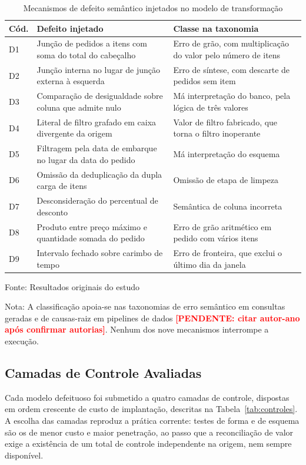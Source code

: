 \documentclass[11pt,a4paper]{article}
\newcommand{\fonteprop}[1]{%
  \par\vspace{2pt}%
  {\singlespacing\fontsize{11}{13}\selectfont\RaggedRight Fonte: #1\par}}
\newcommand{\fonteoriginal}{\fonteprop{Resultados originais do estudo}}
\newcommand{\notatab}[1]{%
  \par{\singlespacing\fontsize{11}{13}\selectfont\RaggedRight Nota: #1\par}}
\newcommand{\pend}[1]{\textcolor{red}{\textbf{[PENDENTE: #1]}}}
\begin{document}
\begin{table}[htbp]
\centering
\caption{Mecanismos de defeito semântico injetados no modelo de transformação}
\label{tab:defeitos}
\begin{singlespace}
\fontsize{10}{12}\selectfont
\begin{tabular}{@{}p{0.8cm}p{6.6cm}p{7.2cm}@{}}
\toprule
\textbf{Cód.} & \textbf{Defeito injetado} & \textbf{Classe na taxonomia} \\
\midrule
D1 & Junção de pedidos a itens com soma do total do cabeçalho & Erro de grão, com multiplicação do valor pelo número de itens \\
D2 & Junção interna no lugar de junção externa à esquerda & Erro de síntese, com descarte de pedidos sem item \\
D3 & Comparação de desigualdade sobre coluna que admite nulo & Má interpretação do banco, pela lógica de três valores \\
D4 & Literal de filtro grafado em caixa divergente da origem & Valor de filtro fabricado, que torna o filtro inoperante \\
D5 & Filtragem pela data de embarque no lugar da data do pedido & Má interpretação do esquema \\
D6 & Omissão da deduplicação da dupla carga de itens & Omissão de etapa de limpeza \\
D7 & Desconsideração do percentual de desconto & Semântica de coluna incorreta \\
D8 & Produto entre preço máximo e quantidade somada do pedido & Erro de grão aritmético em pedido com vários itens \\
D9 & Intervalo fechado sobre carimbo de tempo & Erro de fronteira, que exclui o último dia da janela \\
\bottomrule
\end{tabular}
\end{singlespace}
\fonteoriginal
\notatab{A classificação apoia-se nas taxonomias de erro semântico em
consultas geradas e de causas-raiz em pipelines de dados
\pend{citar autor-ano após confirmar autorias}. Nenhum dos nove
mecanismos interrompe a execução.}
\end{table}

\subsection{Camadas de Controle Avaliadas}

Cada modelo defeituoso foi submetido a quatro camadas de controle,
dispostas em ordem crescente de custo de implantação, descritas na
Tabela~\ref{tab:controles}. A escolha das camadas reproduz a prática
corrente: testes de forma e de esquema são os de menor custo e maior
penetração, ao passo que a reconciliação de valor exige a existência de um
total de controle independente na origem, nem sempre disponível.
\end{document}
